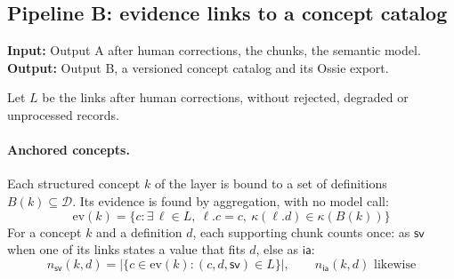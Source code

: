 \documentclass[11pt,a4paper]{article}
\newcommand{\sv}{\mathsf{sv}}
\newcommand{\ia}{\mathsf{ia}}
\begin{document}
\subsection{Pipeline B: evidence links to a concept catalog}\label{sec:pipeB}
\noindent\textbf{Input:} Output A after human corrections, the chunks, the semantic model. \textbf{Output:} Output B, a versioned concept catalog and its Ossie export.

Let $L$ be the links after human corrections, without rejected, degraded or unprocessed records.

\paragraph{Anchored concepts.}
Each structured concept $k$ of the layer is bound to a set of definitions $B(k) \subseteq \mathcal{D}$. Its evidence is found by aggregation, with no model call:
\begin{equation}
\mathrm{ev}(k) = \{c : \exists\, \ell \in L,\ \ell.c = c,\ \kappa(\ell.d) \in \kappa(B(k))\}
\end{equation}
For a concept $k$ and a definition $d$, each supporting chunk counts once: as $\sv$ when one of its links states a value that fits $d$, else as $\ia$:
\begin{equation}
n_{\sv}(k,d) = |\{c \in \mathrm{ev}(k) : (c,d,\sv) \in L\}|, \qquad n_{\ia}(k,d) \text{ likewise}
\end{equation}
\end{document}
